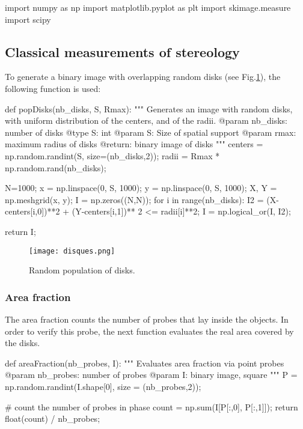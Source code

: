 \def\QRCODE{TB_IPR_TUT.IMG.stereology_pythonqrcode.png}
\def\QRPAGE{http://www.iptutorials.science/tree/master/TB_IPR/TUT.IMG.stereology/python}

\begin{python}
import numpy as np
import matplotlib.pyplot as plt
import skimage.measure
import scipy
\end{python}

\subsection{Classical measurements of stereology}

To generate a binary image with overlapping random disks (see Fig.\ref{fig:stereology:python:disks}), the following function is used:
\begin{python}
def popDisks(nb_disks, S, Rmax):
    """ Generates an image with random disks, with uniform distribution of the centers, and of the radii.
    @param nb_disks: number of disks
    @type S: int
    @param S: Size of spatial support
    @param rmax: maximum radius of disks
    @return: binary image of disks
    """
    centers = np.random.randint(S, size=(nb_disks,2));
    radii = Rmax * np.random.rand(nb_disks);
    
    N=1000;
    x = np.linspace(0, S, 1000);
    y = np.linspace(0, S, 1000);
    X, Y = np.meshgrid(x, y);
    I = np.zeros((N,N));
    for i in range(nb_disks):
        I2 = (X-centers[i,0])**2 + (Y-centers[i,1])** 2 <= radii[i]**2;
        I = np.logical_or(I, I2);
        
    return I;
\end{python}

\begin{figure}[htbp]
 \centering\caption{Random population of disks.}%
 \texttt{[image: disques.png]}%
 \label{fig:stereology:python:disks}%
\end{figure}

\subsubsection{Area fraction}
The area fraction counts the number of probes that lay inside the objects. In order to verify this probe, the next function evaluates the real area covered by the disks.
\begin{python}
def areaFraction(nb_probes, I):
    """
    Evaluates area fraction via point probes
    @param nb_probes: number of probes
    @param I: binary image, square
    """
    P = np.random.randint(I.shape[0], size = (nb_probes,2));

    # count the number of probes in phase
    count = np.sum(I[P[:,0], P[:,1]]);
    return float(count) / nb_probes;
\end{python}

